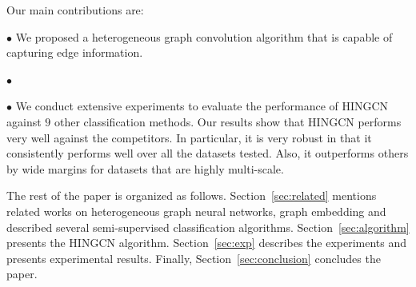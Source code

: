 Our main contributions are:

\noindent$\bullet$
We proposed a heterogeneous graph convolution algorithm that is capable of capturing edge information.

\noindent$\bullet$

\noindent$\bullet$
We conduct extensive experiments %
to evaluate the performance of HINGCN
against $9$ other classification methods. 
Our results show that HINGCN performs very well against the competitors. 
In particular, it is very robust in that it consistently performs well over all the datasets tested. 
Also, it outperforms others by wide margins for datasets that are highly multi-scale. 

The rest of the paper is organized as follows.
Section~\ref{sec:related} mentions related works on heterogeneous graph neural networks, graph embedding and described several semi-supervised classification algorithms.
Section~\ref{sec:algorithm} presents the HINGCN algorithm.
Section~\ref{sec:exp} describes the experiments and presents experimental results.
Finally, Section~\ref{sec:conclusion} concludes the paper.



%
%

